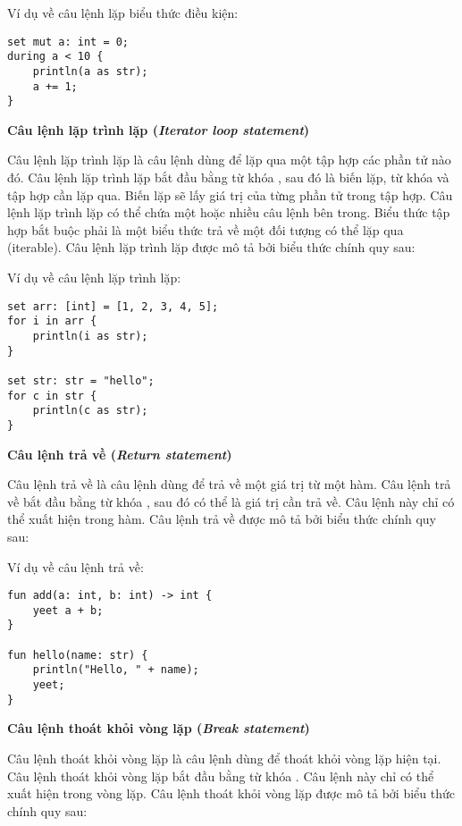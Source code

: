 \regexpredloopstmt

\noindent Ví dụ về câu lệnh lặp biểu thức điều kiện:
\begin{lstlisting}[]
set mut a: int = 0;
during a < 10 {
    println(a as str);
    a += 1;
}
\end{lstlisting}

\noindent\textbf{\label{ch2:for_stmt}Câu lệnh lặp trình lặp (\textit{Iterator loop statement})}

    Câu lệnh lặp trình lặp là câu lệnh dùng để lặp qua một tập hợp các phần tử nào đó. Câu lệnh lặp trình lặp bắt đầu bằng từ khóa , sau đó là biến lặp, từ khóa  và tập hợp cần lặp qua. Biến lặp sẽ lấy giá trị của từng phần tử trong tập hợp. Câu lệnh lặp trình lặp có thể chứa một hoặc nhiều câu lệnh bên trong. Biểu thức tập hợp bắt buộc phải là một biểu thức trả về một đối tượng có thể lặp qua (iterable). Câu lệnh lặp trình lặp được mô tả bởi biểu thức chính quy sau:

\regexiterloopstmt

\noindent Ví dụ về câu lệnh lặp trình lặp:
\begin{lstlisting}[]
set arr: [int] = [1, 2, 3, 4, 5];
for i in arr {
    println(i as str);
}

set str: str = "hello";
for c in str {
    println(c as str);
}
\end{lstlisting}

\noindent\textbf{\label{ch2:return_stmt}Câu lệnh trả về (\textit{Return statement})}

    Câu lệnh trả về là câu lệnh dùng để trả về một giá trị từ một hàm. Câu lệnh trả về bắt đầu bằng từ khóa , sau đó có thể là giá trị cần trả về. Câu lệnh này chỉ có thể xuất hiện trong hàm. Câu lệnh trả về được mô tả bởi biểu thức chính quy sau:

\regexreturnstmt

\noindent Ví dụ về câu lệnh trả về:
\begin{lstlisting}[]
fun add(a: int, b: int) -> int {
    yeet a + b;
}

fun hello(name: str) {
    println("Hello, " + name);
    yeet;
}
\end{lstlisting}

\noindent\textbf{\label{ch2:break_stmt}Câu lệnh thoát khỏi vòng lặp (\textit{Break statement})}

    Câu lệnh thoát khỏi vòng lặp là câu lệnh dùng để thoát khỏi vòng lặp hiện tại. Câu lệnh thoát khỏi vòng lặp bắt đầu bằng từ khóa . Câu lệnh này chỉ có thể xuất hiện trong vòng lặp. Câu lệnh thoát khỏi vòng lặp được mô tả bởi biểu thức chính quy sau:

